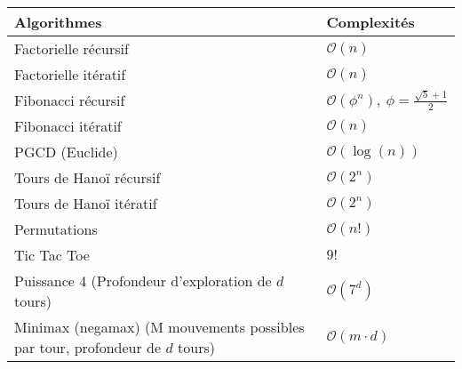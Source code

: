 \documentclass[landscape]{article}
\renewenvironment{minipage}{\vspace{0.5em}\begin{oldminipage}{\linewidth}}{\end{oldminipage}}
\begin{document}
\begin{multicols*}{3}
        \noindent\begin{minipage}
            \centering
            \begin{tabular}{l|l}
                \textbf{Algorithmes}    & \textbf{Complexités}                                                      \\
                \hline
                Factorielle récursif    & \cellcolor{corange!30}$\mathcal{O}(n)$                                    \\
                Factorielle itératif    & \cellcolor{corange!30}$\mathcal{O}(n)$                                    \\
                Fibonacci récursif      & \cellcolor{cpurple!30}$\mathcal{O}(\phi^n),\ \phi = \frac{\sqrt{5}+1}{2}$ \\
                Fibonacci itératif      & \cellcolor{corange!30}$\mathcal{O}(n)$                                    \\
                PGCD (Euclide)          & \cellcolor{clime!30}$\mathcal{O}(\log(n))$                                \\
                Tours de Hanoï récursif & \cellcolor{cpurple!30}$\mathcal{O}(2^n)$                                  \\
                Tours de Hanoï itératif & \cellcolor{cpurple!30}$\mathcal{O}(2^n)$                                  \\
                Permutations            & \cellcolor{cpurple!30}$\mathcal{O}(n!)$                                   \\
                Tic Tac Toe             & \cellcolor{cgreen!30}$9!$                                                 \\
                \makecell[l]{Puissance 4                                                                            \\(Profondeur d’exploration de $d$ tours)}                             & \cellcolor{cpurple!30}$\mathcal{O}(7^d)$             \\
                \makecell[l]{Minimax (negamax)                                                                      \\(M mouvements possibles par tour,\\profondeur de $d$ tours)}                       & \cellcolor{cpurple!30}$\mathcal{O}(m \cdot d)$       \\
            \end{tabular}
        \end{minipage}\\


\end{multicols*}
\end{document}
